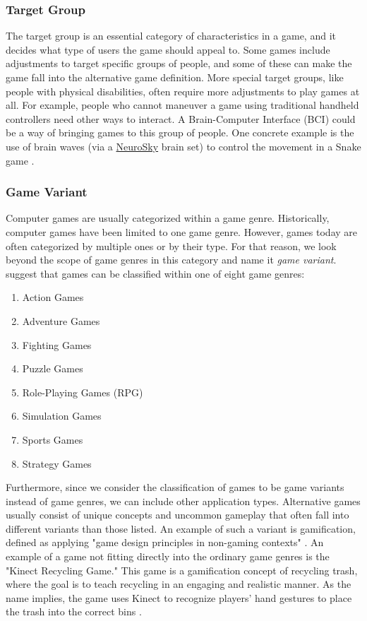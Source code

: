 \subsubsection{Target Group}
The target group is an essential category of characteristics in a game, and it decides what type of users the game should appeal to. Some games include adjustments to target specific groups of people, and some of these can make the game fall into the alternative game definition. More special target groups, like people with physical disabilities, often require more adjustments to play games at all. For example, people who cannot maneuver a game using traditional handheld controllers need other ways to interact. A Brain-Computer Interface (BCI) could be a way of bringing games to this group of people. One concrete example is the use of brain waves (via a \href{www.neurosky.com}{NeuroSky} brain set) to control the movement in a Snake game \citep{wang_using_2012}.

\subsubsection{Game Variant}
Computer games are usually categorized within a game genre. Historically, computer games have been limited to one game genre. However, games today are often categorized by multiple ones or by their type. For that reason, we look beyond the scope of game genres in this category and name it \textit{game variant}. \citet{prensky_fun_2001} suggest that games can be classified within one of eight game genres:

\begin{enumerate}[noitemsep]
    \item Action Games
    \item Adventure Games
    \item Fighting Games
    \item Puzzle Games
    \item Role-Playing Games (RPG)
    \item Simulation Games
    \item Sports Games
    \item Strategy Games
\end{enumerate}

Furthermore, since we consider the classification of games to be game variants instead of game genres, we can include other application types. Alternative games usually consist of unique concepts and uncommon gameplay that often fall into different variants than those listed. An example of such a variant is gamification, defined as applying "game design principles in non-gaming contexts" \citep{robson_is_2015}. An example of a game not fitting directly into the ordinary game genres is the "Kinect Recycling Game." This game is a gamification concept of recycling trash, where the goal is to teach recycling in an engaging and realistic manner. As the name implies, the game uses Kinect to recognize players' hand gestures to place the trash into the correct bins \citep{wang_learning_2015}.

